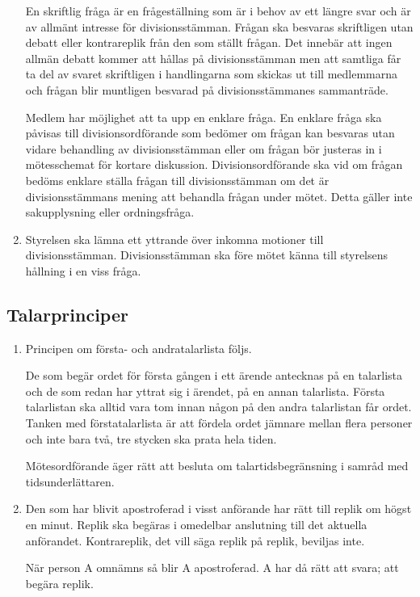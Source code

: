 \documentclass{dvd}
\begin{document}
\begin{enumerate}[label=\arabic* §, ref=\arabic*]
		En skriftlig fråga är en frågeställning som är i behov av ett längre svar och är av allmänt intresse för divisionsstämman.
		Frågan ska besvaras skriftligen utan debatt eller kontrareplik från den som ställt frågan.
		Det innebär att ingen allmän debatt kommer att hållas på divisionsstämman men att samtliga får ta del av svaret skriftligen i handlingarna som skickas ut till medlemmarna och frågan blir muntligen besvarad på divisionsstämmanes sammanträde.

		Medlem har möjlighet att ta upp en enklare fråga.
		En enklare fråga ska påvisas till divisionsordförande som bedömer om frågan kan besvaras utan vidare behandling av divisionsstämman eller om frågan bör justeras in i mötesschemat för kortare diskussion.
		Divisionsordförande ska vid om frågan bedöms enklare ställa frågan till divisionsstämman om det är divisionsstämmans mening att behandla frågan under mötet.
		Detta gäller inte sakupplysning eller ordningsfråga.

		\item Styrelsen ska lämna ett yttrande över inkomna motioner till divisionsstämman.
		Divisionsstämman ska före mötet känna till styrelsens hållning i en viss fråga.
	\end{enumerate}

	\subsection{Talarprinciper}

	\begin{enumerate}[label=\arabic* §, ref=\arabic*]
		\item Principen om första- och andratalarlista följs.

		De som begär ordet för första gången i ett ärende antecknas på en talarlista och de som redan har yttrat sig i ärendet, på en annan talarlista.
		Första talarlistan ska alltid vara tom innan någon på den andra talarlistan får ordet.
		Tanken med förstatalarlista är att fördela ordet jämnare mellan flera personer och inte bara två, tre stycken ska prata hela tiden.

		Mötesordförande äger rätt att besluta om talartidsbegränsning i samråd med tidsunderlättaren.

		\item Den som har blivit apostroferad i visst anförande har rätt till replik om högst en minut.
		Replik ska begäras i omedelbar anslutning till det aktuella anförandet.
		Kontrareplik, det vill säga replik på replik, beviljas inte.

		När person A omnämns så blir A apostroferad. A har då rätt att svara; att begära replik.
	\end{enumerate}
\end{document}
